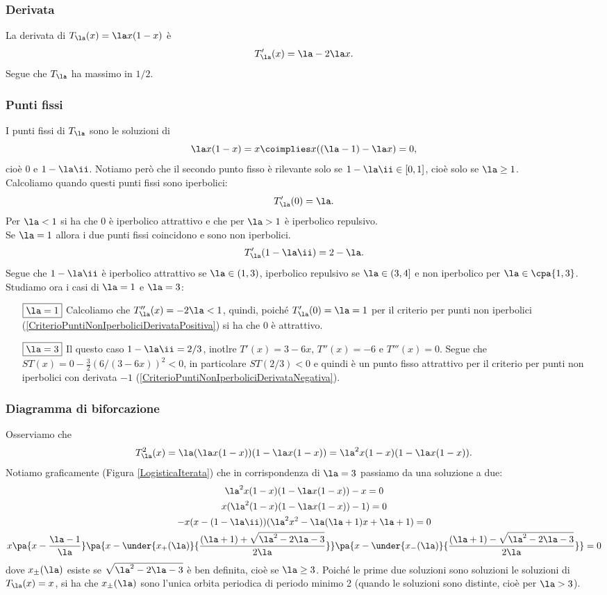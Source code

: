 \subsubsection{Derivata}
La derivata di $T_\la(x)=\la x(1-x)$ \`e
\[T'_\la(x)=\la-2\la x.\]
Segue che $T_\la$ ha massimo in $1/2$.
\subsubsection{Punti fissi}
I punti fissi di $T_\la$ sono le soluzioni di
\[\la x(1-x)=x\coimplies x((\la-1)-\la x)=0,\]
cio\`e $0$ e $1-\la\ii$. Notiamo per\`o che il secondo punto fisso \`e rilevante solo se $1-\la\ii\in [0,1]$, cio\`e solo se $\la\geq 1$.\\
Calcoliamo quando questi punti fissi sono iperbolici:
\[T'_\la(0)=\la.\]
Per $\la<1$ si ha che $0$ \`e iperbolico attrattivo e che per $\la>1$ \`e iperbolico repulsivo.\\
Se $\la=1$ allora i due punti fissi coincidono e sono non iperbolici.
\[T'_\la(1-\la\ii)=2-\la.\]
Segue che $1-\la\ii$ \`e iperbolico attrattivo se $\la\in (1,3)$, iperbolico repulsivo se $\la\in (3,4]$ e non iperbolico per $\la\in\cpa{1,3}$.
Studiamo ora i casi di $\la=1$ e $\la=3$:
\setlength{\leftmargini}{0cm}
\begin{itemize}
\item[$\boxed{\la=1}$] Calcoliamo che $T_\la''(x)=-2\la<1$, quindi, poich\'e $T_\la'(0)=\la=1$ per il criterio per punti non iperbolici (\ref{CriterioPuntiNonIperboliciDerivataPositiva}) si ha che $0$ \`e attrattivo.
\item[$\boxed{\la=3}$] Il questo caso $1-\la\ii=2/3$, inotlre $T'(x)=3-6x$, $T''(x)=-6$ e $T'''(x)=0$. Segue che $ST(x)=0-\frac32(6/(3-6x))^2<0$, in particolare $ST(2/3)<0$ e quindi \`e un punto fisso attrattivo per il criterio per punti non iperbolici con derivata $-1$ (\ref{CriterioPuntiNonIperboliciDerivataNegativa}).
\end{itemize}


\subsubsection{Diagramma di biforcazione}
Osserviamo che 
\[T_\la^2(x)=\la(\la x(1-x))(1-\la x(1-x))=\la^2 x(1-x)(1-\la x(1-x)).\]
\noindent
Notiamo graficamente (Figura \ref{LogisticaIterata}) che in corrispondenza di $\la=3$ passiamo da una soluzione a due:
\begin{gather*}
\la^2 x(1-x)(1-\la x(1-x))-x=0\\
x(\la^2(1-x)(1-\la x(1-x))-1)=0\\
-x(x-(1-\la\ii))(\la^2x^2-\la(\la+1)x+\la+1)=0\\
x\pa{x-\frac{\la-1}\la}\pa{x-\under{x_+(\la)}{\frac{(\la+1)+\sqrt{\la^2-2\la-3}}{2\la}}}\pa{x-\under{x_-(\la)}{\frac{(\la+1)-\sqrt{\la^2-2\la-3}}{2\la}}}=0
\end{gather*}
dove $x_{\pm}(\la)$ esiste se $\sqrt{\la^2-2\la-3}$ \`e ben definita, cio\`e se $\la\geq 3$. Poich\'e le prime due soluzioni sono soluzioni le soluzioni di $T_\la(x)=x$, si ha che $x_{\pm}(\la)$ sono l'unica orbita periodica di periodo minimo 2 (quando le soluzioni sono distinte, cio\`e per $\la>3$).

